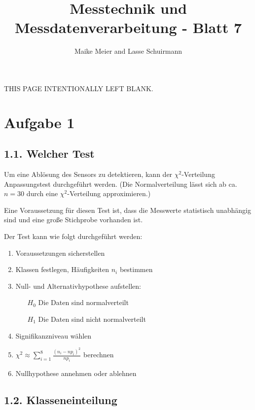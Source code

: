 \documentclass[12pt,a4paper]{article}
\author{Maike Meier and Lasse Schuirmann}
\title{Messtechnik und Messdatenverarbeitung - Blatt 7}
\newcommand*{\blankpage}{
  \vspace*{\fill}
  \begin{flushright}
  \tiny THIS PAGE INTENTIONALLY LEFT BLANK.
  \end{flushright}
  \pagebreak
}
\begin{document}

\maketitle
\pagebreak

\blankpage

\section*{Aufgabe 1}
\subsection*{1.1. Welcher Test}
Um eine Ablösung des Sensors zu detektieren, kann der $\chi^2$-Verteilung Anpassungstest durchgeführt werden. (Die Normalverteilung lässt sich ab ca. $n=30$ durch eine $\chi^2$-Verteilung approximieren.)

Eine Voraussetzung für diesen Test ist, dass die Messwerte statistisch unabhängig sind und eine große Stichprobe vorhanden ist.

Der Test kann wie folgt durchgeführt werden:

\begin{enumerate}
\item Voraussetzungen sicherstellen
\item Klassen festlegen, Häufigkeiten $n_i$ bestimmen
\item Null- und Alternativhypothese aufstellen:
\begin{itemize}
 \item[$H_0$] Die Daten sind normalverteilt
 \item[$H_1$] Die Daten sind nicht normalverteilt
\end{itemize}
\item Signifikanzniveau wählen
\item $\chi^2 \approx \sum\limits_{i=1}^8 \frac{(n_i -n p_i)^2}{n p_i}$ berechnen
\item Nullhypothese annehmen oder ablehnen
\end{enumerate}

\subsection*{1.2. Klasseneinteilung}
\end{document}

